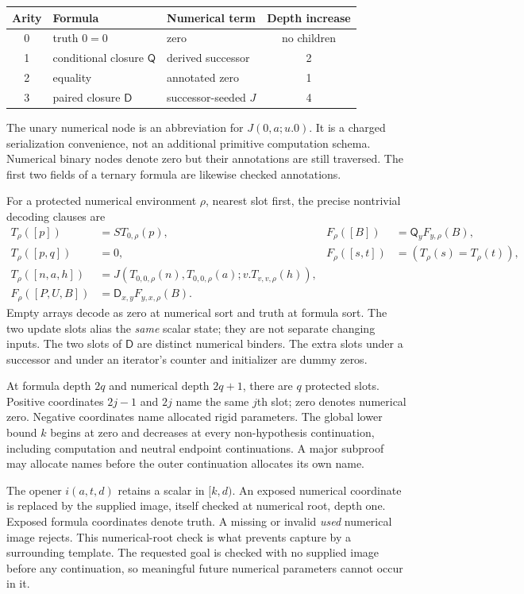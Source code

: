 \documentclass[11pt,letterpaper]{article}
\theoremstyle{definition}\newtheorem{definition}[theorem]{Definition}
\theoremstyle{remark}\newtheorem{remark}[theorem]{Remark}
\newcommand{\D}{\mathsf D}
\newcommand{\Q}{\mathsf Q}
\begin{document}
\begin{center}
\begin{tabular}{cllc}
\toprule
Arity & Formula & Numerical term & Depth increase\\
\midrule
0 & truth $0=0$ & zero & no children\\
1 & conditional closure $\Q$ & derived successor & 2\\
2 & equality & annotated zero & 1\\
3 & paired closure $\D$ & successor-seeded $J$ & 4\\
\bottomrule
\end{tabular}
\end{center}
The unary numerical node is an abbreviation for $J(0,a;u.0)$.
It is a charged serialization convenience, not an additional primitive
computation schema. Numerical binary nodes denote zero but their
annotations are still traversed. The first two fields of a ternary
formula are likewise checked annotations.

For a protected numerical environment $\rho$, nearest slot first, the
precise nontrivial decoding clauses are
\[
\begin{aligned}
 T_\rho([p])&=S T_{0,\rho}(p),&
 F_\rho([B])&=\Q_y F_{y,\rho}(B),\\
 T_\rho([p,q])&=0,&
 F_\rho([s,t])&=(T_\rho(s)=T_\rho(t)),\\
 T_\rho([n,a,h])&=
 J(T_{0,0,\rho}(n),T_{0,0,\rho}(a);v.T_{v,v,\rho}(h)),\\
 F_\rho([P,U,B])&=\D_{x,y}F_{y,x,\rho}(B).
\end{aligned}
\]
Empty arrays decode as zero at numerical sort and truth at formula sort.
The two update slots alias the \emph{same} scalar state; they are not
separate changing inputs. The two slots of $\D$ are distinct numerical
binders. The extra slots under a successor and under an iterator's
counter and initializer are dummy zeros.

At formula depth $2q$ and numerical depth $2q+1$, there are $q$ protected
slots. Positive coordinates $2j-1$ and $2j$ name the same $j$th slot;
zero denotes numerical zero. Negative coordinates name allocated rigid
parameters. The global lower bound $k$ begins at zero and decreases at
every non-hypothesis continuation, including computation and neutral
endpoint continuations. A major subproof may allocate names before the
outer continuation allocates its own name.

The opener $i(a,t,d)$ retains a scalar in $[k,d)$. An exposed numerical
coordinate is replaced by the supplied image, itself checked at numerical
root, depth one. Exposed formula coordinates denote truth. A missing or
invalid \emph{used} numerical image rejects. This numerical-root check is
what prevents capture by a surrounding template. The requested goal is
checked with no supplied image before any continuation, so meaningful
future numerical parameters cannot occur in it.
\end{document}

